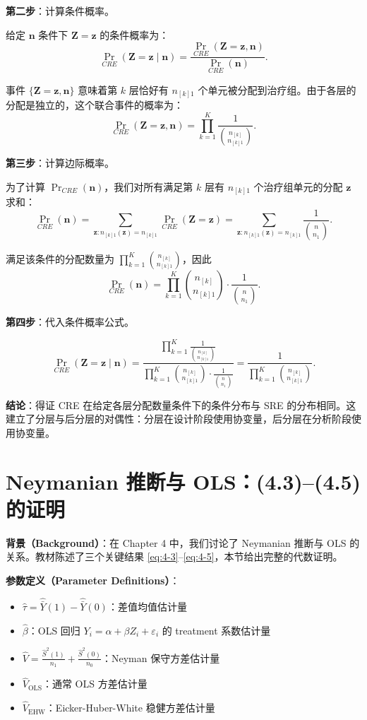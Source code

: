 \textbf{第二步}：计算条件概率。

给定 $\mathbf{n}$ 条件下 $\mathbf{Z} = \mathbf{z}$ 的条件概率为：
\[
\Pr_{CRE}(\mathbf{Z} = \mathbf{z} \mid \mathbf{n}) = \frac{\Pr_{CRE}(\mathbf{Z} = \mathbf{z}, \mathbf{n})}{\Pr_{CRE}(\mathbf{n})}.
\]

事件 $\{\mathbf{Z} = \mathbf{z}, \mathbf{n}\}$ 意味着第 $k$ 层恰好有 $n_{[k]1}$ 个单元被分配到治疗组。由于各层的分配是独立的，这个联合事件的概率为：
\[
\Pr_{CRE}(\mathbf{Z} = \mathbf{z}, \mathbf{n}) = \prod_{k=1}^K \frac{1}{\binom{n_{[k]}}{n_{[k]1}}}.
\]

\textbf{第三步}：计算边际概率。

为了计算 $\Pr_{CRE}(\mathbf{n})$，我们对所有满足第 $k$ 层有 $n_{[k]1}$ 个治疗组单元的分配 $\mathbf{z}$ 求和：
\[
\Pr_{CRE}(\mathbf{n}) = \sum_{\mathbf{z}: n_{[k]1}(\mathbf{z}) = n_{[k]1}} \Pr_{CRE}(\mathbf{Z} = \mathbf{z}) = \sum_{\mathbf{z}: n_{[k]1}(\mathbf{z}) = n_{[k]1}} \frac{1}{\binom{n}{n_1}}.
\]

满足该条件的分配数量为 $\prod_{k=1}^K \binom{n_{[k]}}{n_{[k]1}}$，因此
\[
\Pr_{CRE}(\mathbf{n}) = \prod_{k=1}^K \binom{n_{[k]}}{n_{[k]1}} \cdot \frac{1}{\binom{n}{n_1}}.
\]

\textbf{第四步}：代入条件概率公式。

\[
\Pr_{CRE}(\mathbf{Z} = \mathbf{z} \mid \mathbf{n}) = \frac{\prod_{k=1}^K \frac{1}{\binom{n_{[k]}}{n_{[k]1}}}}{\prod_{k=1}^K \binom{n_{[k]}}{n_{[k]1}} \cdot \frac{1}{\binom{n}{n_1}}} = \frac{1}{\prod_{k=1}^K \binom{n_{[k]}}{n_{[k]1}}}.
\]

\textbf{结论}：得证 CRE 在给定各层分配数量条件下的条件分布与 SRE 的分布相同。这建立了分层与后分层的对偶性：分层在设计阶段使用协变量，后分层在分析阶段使用协变量。

\section{Neymanian 推断与 OLS：(4.3)--(4.5) 的证明}\label{sec:appendix-4-3-5}
\label{sec:appendix-ex-4-3}

\textbf{背景（Background）}：在 Chapter 4 中，我们讨论了 Neymanian 推断与 OLS 的关系。教材陈述了三个关键结果 \eqref{eq:4-3}--\eqref{eq:4-5}，本节给出完整的代数证明。

\textbf{参数定义（Parameter Definitions）}：
\begin{itemize}
  \item $\hat{\tau} = \hat{\bar{Y}}(1) - \hat{\bar{Y}}(0)$：差值均值估计量
  \item $\hat{\beta}$：OLS 回归 $Y_i = \alpha + \beta Z_i + \varepsilon_i$ 的 treatment 系数估计量
  \item $\hat{V} = \frac{\hat{S}^2(1)}{n_1} + \frac{\hat{S}^2(0)}{n_0}$：Neyman 保守方差估计量
  \item $\hat{V}_{\text{OLS}}$：通常 OLS 方差估计量
  \item $\hat{V}_{\text{EHW}}$：Eicker-Huber-White 稳健方差估计量
\end{itemize}

